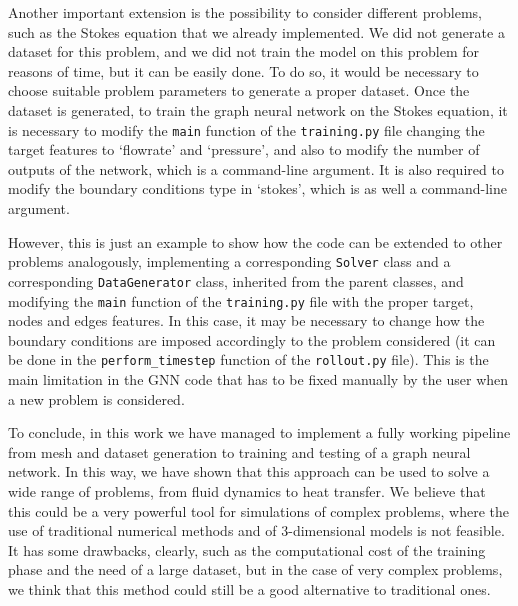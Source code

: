 \documentclass[11pt,a4paper]{article}
\begin{document}
Another important extension is the possibility to consider different problems, such as the Stokes equation that we already implemented. We did not generate a dataset for this problem, and we did not train the model on this problem for reasons of time, but it can be easily done. To do so, it would be necessary to choose suitable problem parameters to generate a proper dataset. 
Once the dataset is generated, to train the graph neural network on the Stokes equation, it is necessary to modify the \texttt{main} function of the \texttt{training.py} file changing the target features to `flowrate' and `pressure', and also to modify the number of outputs of the network, which is a command-line argument. It is also required to modify the boundary conditions type in `stokes', which is as well a command-line argument.

However, this is just an example to show how the code can be extended to other problems analogously, implementing a corresponding \texttt{Solver} class and a corresponding \texttt{DataGenerator} class, inherited from the parent classes, and modifying the \texttt{main} function of the \texttt{training.py} file with the proper target, nodes and edges features. In this case, it may be necessary to change how the boundary conditions are imposed accordingly to the problem considered (it can be done in the \texttt{perform\_timestep} function of the \texttt{rollout.py} file). This is the main limitation in the GNN code that has to be fixed manually by the user when a new problem is considered. 

To conclude, in this work we have managed to implement a fully working pipeline from mesh and dataset generation to training and testing of a graph neural network. In this way, we have shown that this approach can be used to solve a wide range of problems, from fluid dynamics to heat transfer. We believe that this could be a very powerful tool for simulations of complex problems, where the use of traditional numerical methods and of 3-dimensional models is not feasible. It has some drawbacks, clearly, such as the computational cost of the training phase and the need of a large dataset, but in the case of very complex problems, we think that this method could still be a good alternative to traditional ones.


\newpage
\end{document}
